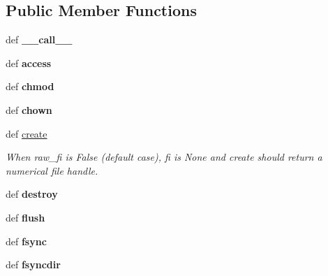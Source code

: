 \subsection*{Public Member Functions}
\begin{DoxyCompactItemize}
\item 
\hypertarget{classfuse_1_1Operations_a09eca05c3940153e47449257c4dae57f}{def {\bfseries \-\_\-\-\_\-call\-\_\-\-\_\-}}\label{classfuse_1_1Operations_a09eca05c3940153e47449257c4dae57f}

\item 
\hypertarget{classfuse_1_1Operations_ac862a7abcf88d4815a9e609066674636}{def {\bfseries access}}\label{classfuse_1_1Operations_ac862a7abcf88d4815a9e609066674636}

\item 
\hypertarget{classfuse_1_1Operations_ac4bd3c5c23254d40aa5b50ece912d8cb}{def {\bfseries chmod}}\label{classfuse_1_1Operations_ac4bd3c5c23254d40aa5b50ece912d8cb}

\item 
\hypertarget{classfuse_1_1Operations_aa1ee7eb284c6b01a0462f59dd892821d}{def {\bfseries chown}}\label{classfuse_1_1Operations_aa1ee7eb284c6b01a0462f59dd892821d}

\item 
def \hyperlink{classfuse_1_1Operations_ab1b3f0e9731fc8b85187b162a1179b17}{create}
\begin{DoxyCompactList}\small\item\em When raw\-\_\-fi is False (default case), fi is None and create should return a numerical file handle. \end{DoxyCompactList}\item 
\hypertarget{classfuse_1_1Operations_adf7a979f2cde97c44bc28feaac9a9794}{def {\bfseries destroy}}\label{classfuse_1_1Operations_adf7a979f2cde97c44bc28feaac9a9794}

\item 
\hypertarget{classfuse_1_1Operations_a4362f7fcb3a3d6ace06c7bc113cfbf0c}{def {\bfseries flush}}\label{classfuse_1_1Operations_a4362f7fcb3a3d6ace06c7bc113cfbf0c}

\item 
\hypertarget{classfuse_1_1Operations_aa2b5a8b82cf35642cbe966346f335ef9}{def {\bfseries fsync}}\label{classfuse_1_1Operations_aa2b5a8b82cf35642cbe966346f335ef9}

\item 
\hypertarget{classfuse_1_1Operations_a0cc7a9f54e713e2650dff734eb91a550}{def {\bfseries fsyncdir}}\label{classfuse_1_1Operations_a0cc7a9f54e713e2650dff734eb91a550}


\end{DoxyCompactItemize}
